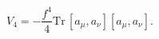 \begin{equation}
V_4 = - \frac{f^4}{4} \textrm{Tr} \, [ a_{\mu},a_{\nu} ] [
a_{\mu},a_{\nu} ] .
\end{equation}

